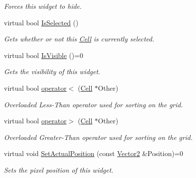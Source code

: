 \begin{DoxyCompactItemize}
\begin{DoxyCompactList}\small\item\em Forces this widget to hide. \item\end{DoxyCompactList}\item 
virtual bool \hyperlink{classphys_1_1UI_1_1Cell_a5f7008c9177a44786215970a3f0849d3}{IsSelected} ()
\begin{DoxyCompactList}\small\item\em Gets whether or not this \hyperlink{classphys_1_1UI_1_1Cell}{Cell} is currently selected. \item\end{DoxyCompactList}\item 
virtual bool \hyperlink{classphys_1_1UI_1_1Cell_a77625842ac8ad87bd5b5a7f6ed0590b8}{IsVisible} ()=0
\begin{DoxyCompactList}\small\item\em Gets the visibility of this widget. \item\end{DoxyCompactList}\item 
virtual bool \hyperlink{classphys_1_1UI_1_1Cell_a99be02a1d02b65f653d46e00bef0c819}{operator$<$} (\hyperlink{classphys_1_1UI_1_1Cell}{Cell} $\ast$Other)
\begin{DoxyCompactList}\small\item\em Overloaded Less-\/Than operator used for sorting on the grid. \item\end{DoxyCompactList}\item 
virtual bool \hyperlink{classphys_1_1UI_1_1Cell_ac60ff0871b40be61f51fc82e09fb8a5f}{operator$>$} (\hyperlink{classphys_1_1UI_1_1Cell}{Cell} $\ast$Other)
\begin{DoxyCompactList}\small\item\em Overloaded Greater-\/Than operator used for sorting on the grid. \item\end{DoxyCompactList}\item 
virtual void \hyperlink{classphys_1_1UI_1_1Cell_ae8b1850754b6b9ea48636b619dada5ea}{SetActualPosition} (const \hyperlink{classphys_1_1Vector2}{Vector2} \&Position)=0
\begin{DoxyCompactList}\small\item\em Sets the pixel position of this widget. \item\end{DoxyCompactList}\item 

\end{DoxyCompactItemize}
